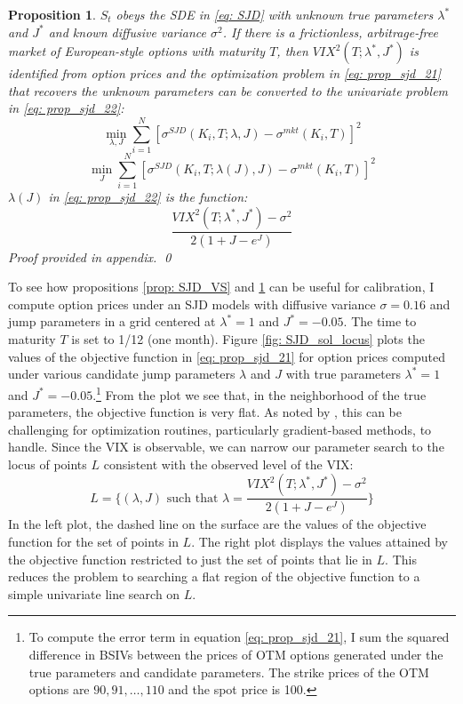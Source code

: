 \documentclass[12pt]{article}
\newtheorem{proposition}{Proposition}
\begin{document}
\begin{proposition}\label{prop: SJD_VIX} 
$S_t$ obeys the SDE in \eqref{eq: SJD} with unknown true parameters $\lambda^*$ and $J^*$ and known diffusive variance $\sigma^2$. If there is a frictionless, arbitrage-free market of European-style options with maturity $T$, then $VIX^2(T; \lambda^*, J^*)$ is identified from option prices and the optimization problem in \eqref{eq: prop_sjd_21} that recovers the unknown parameters can be converted to the univariate problem in \eqref{eq: prop_sjd_22}:
\begin{equation}\label{eq: prop_sjd_21}
  \min\limits_{\lambda, J} \sum\limits_{i=1}^N \left[\sigma^{SJD}(K_i, T; \lambda, J) - \sigma^{mkt}(K_i, T)\right]^2 
\end{equation}
\begin{equation}\label{eq: prop_sjd_22}
  \min\limits_{J}  \sum\limits_{i=1}^N \left[\sigma^{SJD}(K_i, T; \lambda(J), J) - \sigma^{mkt}(K_i, T)\right]^2 
\end{equation}
$\lambda(J)$ in \eqref{eq: prop_sjd_22} is the function:
$$  \dfrac{  VIX^2(T; \lambda^*, J^*)  - \sigma^2 }{2(1+J - e^J)} $$  
Proof provided in appendix.
\qed
\end{proposition}

To see how propositions \ref{prop: SJD_VS} and \ref{prop: SJD_VIX} can be useful for calibration, I compute option prices under an SJD models with diffusive variance $\sigma = 0.16$ and jump parameters in a grid centered at $\lambda^* = 1$ and $J^* = -0.05$. The time to maturity $T$ is set to 1/12 (one month). Figure \ref{fig: SJD_sol_locus} plots the values of the objective function in \eqref{eq: prop_sjd_21} for option prices computed under various candidate jump parameters $\lambda$ and $J$ with true parameters $\lambda^* = 1$ and $J^* = -0.05$.\footnote{To compute the error term in equation \eqref{eq: prop_sjd_21}, I sum the squared difference in BSIVs between the prices of OTM options generated under the true parameters and candidate parameters. The strike prices of the OTM options are $ 90, 91, \ldots, 110$ and the spot price is 100.} From the plot we see that, in the neighborhood of the true parameters, the objective function is very flat. As noted by \cite{cont2004nonparametric}, this can be challenging for optimization routines, particularly gradient-based methods, to handle. Since the VIX is observable, we can narrow our parameter search to the locus of points $L$ consistent with the observed level of the VIX:
$$L = \Bigg\lbrace (\lambda, J) \text{ such that }  \lambda =  \dfrac{VIX^{2}(T; \lambda^*, J^*) - \sigma^2}{2(1+J - e^J)} \Bigg\rbrace $$
In the left plot, the dashed line on the surface are the values of the objective function for the set of points in $L$. The right plot displays the values attained by the objective function restricted to just the set of points that lie in $L$. This reduces the problem to searching a flat region of the objective function to a simple univariate line search on $L$. 
\end{document}
